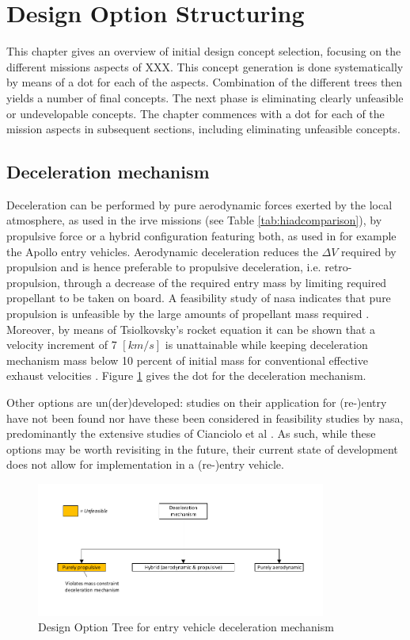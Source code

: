 \section{Design Option Structuring} \label{ch:design}
This chapter gives an overview of initial design concept selection, focusing on the different missions aspects of XXX. This concept generation is done systematically by means of a \gls{dot} for each of the aspects. Combination of the different trees then yields a number of final concepts. The next phase is eliminating clearly unfeasible or undevelopable concepts. The chapter commences with a \gls{dot} for each of the mission aspects in subsequent sections, including eliminating unfeasible concepts.

\subsection{Deceleration mechanism}
Deceleration can be performed by pure aerodynamic forces exerted by the local atmosphere, as used in the \gls{irve} missions (see Table \ref{tab:hiadcomparison}), by propulsive force or a hybrid configuration featuring both, as used in for example the Apollo entry vehicles. Aerodynamic deceleration reduces the $\Delta V$ required by propulsion and is hence preferable to propulsive deceleration, i.e. retro-propulsion, through a decrease of the required entry mass by limiting required propellant to be taken on board. A feasibility study of \gls{nasa} indicates that pure propulsion is unfeasible by the large amounts of propellant mass required \cite{Cianciolo2010}. Moreover, by means of Tsiolkovsky's rocket equation it can be shown that a velocity increment of 7 $[km/s]$ is unattainable while keeping deceleration mechanism mass below 10 percent of initial mass for conventional effective exhaust velocities \cite{Wertz2011}. Figure \ref{fig:dotdelmech} gives the \gls{dot} for the deceleration mechanism.

Other options are un(der)developed: studies on their application for (re-)entry have not been found nor have these been considered in feasibility studies by \gls{nasa}, predominantly the extensive studies of Cianciolo et al \cite{Cianciolo2010}. As such, while these options may be worth revisiting in the future, their current state of development does not allow for implementation in a (re-)entry vehicle.

\begin{figure}[H]
\centering
\includegraphics[width = 0.85\textwidth]{Figure/DOT_decelerationmechanism.pdf}
\caption{Design Option Tree for entry vehicle deceleration mechanism}
\label{fig:dotdelmech}
\end{figure}

